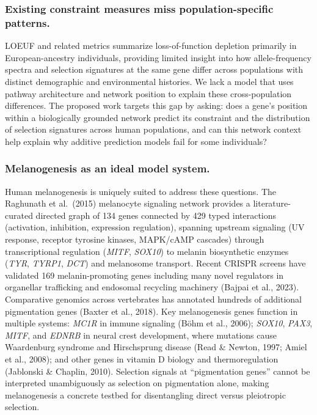 \documentclass[11pt]{article}
\begin{document}
\subsubsection{Existing constraint measures miss population-specific patterns.}
LOEUF and related metrics summarize loss-of-function depletion primarily in European-ancestry individuals, providing limited insight into how allele-frequency spectra and selection signatures at the same gene differ across populations with distinct demographic and environmental histories. We lack a model that uses pathway architecture and network position to explain these cross-population differences. The proposed work targets this gap by asking: does a gene's position within a biologically grounded network predict its constraint and the distribution of selection signatures across human populations, and can this network context help explain why additive prediction models fail for some individuals?

\subsubsection{Melanogenesis as an ideal model system.}
Human melanogenesis is uniquely suited to address these questions. The Raghunath et al.\ (2015) melanocyte signaling network provides a literature-curated directed graph of 134 genes connected by 429 typed interactions (activation, inhibition, expression regulation), spanning upstream signaling (UV response, receptor tyrosine kinases, MAPK/cAMP cascades) through transcriptional regulation (\emph{MITF}, \emph{SOX10}) to melanin biosynthetic enzymes (\emph{TYR}, \emph{TYRP1}, \emph{DCT}) and melanosome transport. Recent CRISPR screens have validated 169 melanin-promoting genes including many novel regulators in organellar trafficking and endosomal recycling machinery (Bajpai et al., 2023). Comparative genomics across vertebrates has annotated hundreds of additional pigmentation genes (Baxter et al., 2018). Key melanogenesis genes function in multiple systems: \emph{MC1R} in immune signaling (B\"{o}hm et al., 2006); \emph{SOX10}, \emph{PAX3}, \emph{MITF}, and \emph{EDNRB} in neural crest development, where mutations cause Waardenburg syndrome and Hirschsprung disease (Read \& Newton, 1997; Amiel et al., 2008); and other genes in vitamin D biology and thermoregulation (Jablonski \& Chaplin, 2010). Selection signals at ``pigmentation genes'' cannot be interpreted unambiguously as selection on pigmentation alone, making melanogenesis a concrete testbed for disentangling direct versus pleiotropic selection.
\end{document}

